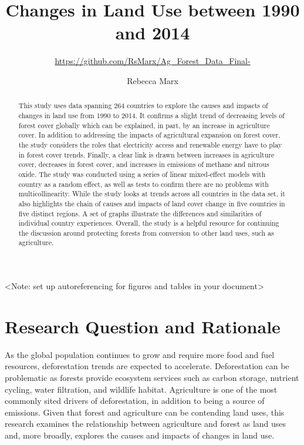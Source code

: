 \documentclass[12pt,]{article}
\title{Changes in Land Use between 1990 and 2014}
\subtitle{\url{https://github.com/RsMarx/Ag_Forest_Data_Final-}}
\author{Rebecca Marx}
\date{}
\begin{document}
\maketitle
\begin{abstract}
This study uses data spanning 264 countries to explore the causes and
impacts of changes in land use from 1990 to 2014. It confirms a slight
trend of decreasing levels of forest cover globally which can be
explained, in part, by an increase in agriculture cover. In addition to
addressing the impacts of agricultural expansion on forest cover, the
study considers the roles that electricity access and renewable energy
have to play in forest cover trends. Finally, a clear link is drawn
between increases in agriculture cover, decreases in forest cover, and
increases in emissions of methane and nitrous oxide. The study was
conducted using a series of linear mixed-effect models with country as a
random effect, as well as tests to confirm there are no problems with
multicollinearity. While the study looks at trends across all countries
in the data set, it also highlights the chain of causes and impacts of
land cover change in five countries in five distinct regions. A set of
graphs illustrate the differences and similarities of individual country
experiences. Overall, the study is a helpful resource for continuing the
discussion around protecting forests from conversion to other land uses,
such as agriculture.
\end{abstract}

\newpage

\tableofcontents  \newpage
\listoftables  \newpage
\listoffigures  \newpage

\textless{}Note: set up autoreferencing for figures and tables in your
document\textgreater{}

\section{Research Question and
Rationale}\label{research-question-and-rationale}

As the global population continues to grow and require more food and
fuel resources, deforestation trends are expected to accelerate.
Deforestation can be problematic as forests provide ecosystem services
such as carbon storage, nutrient cycling, water filtration, and wildlife
habitat. Agriculture is one of the most commonly sited drivers of
deforestation, in addition to being a source of emissions. Given that
forest and agriculture can be contending land uses, this research
examines the relationship between agriculture and forest as land uses
and, more broadly, explores the causes and impacts of changes in land
use.
\end{document}
